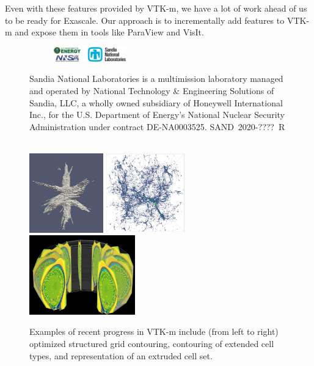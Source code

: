 Even with these features provided by VTK-m, we have a lot of work ahead of us to be ready for Exascale.
Our approach is to incrementally add features to VTK-m and expose them in tools like ParaView and VisIt.


\begin{figure}[t]
  \setlength{\intextsep}{0in}
  \noindent
  \begin{figure}
    \includegraphics[height=0.25in]{projects/2.3.4-DataViz/2.3.4.13-ECP-VTK-m/snl-logos.png}
  \end{figure}
  {\tiny Sandia National Laboratories is a multimission laboratory managed and operated by National Technology \& Engineering Solutions of Sandia, LLC, a wholly owned subsidiary of Honeywell International Inc., for the U.S. Department of Energy's National Nuclear Security Administration under contract DE-NA0003525. \hfill SAND~2020-????~R
  \par}
  ~\\

  \centering
  \includegraphics[height=1.35in]{projects/2.3.4-DataViz/2.3.4.13-ECP-VTK-m/VTKm-flying-edges}\quad
  \includegraphics[height=1.35in]{projects/2.3.4-DataViz/2.3.4.13-ECP-VTK-m/VTKm-contour-cell-types}\quad
  \includegraphics[height=1.35in]{projects/2.3.4-DataViz/2.3.4.13-ECP-VTK-m/VTKm-extruded-cell-set}\quad
  \caption{
    Examples of recent progress in VTK-m include (from left to right) optimized structured grid contouring, contouring of extended cell types, and representation of an extruded cell set.
  }
  \label{fig:VTKmRecent}
\end{figure}


